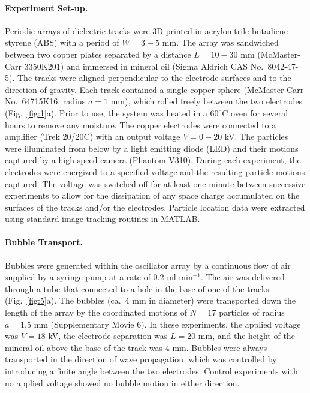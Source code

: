 \paragraph{Experiment Set-up.} 
Periodic arrays of dielectric tracks were 3D printed in acrylonitrile butadiene styrene (ABS) with a period of $W=3-5$ mm. The array was sandwiched between two copper plates separated by a distance $L=10-30$ mm (McMaster-Carr 3350K201) and immersed in mineral oil (Sigma Aldrich CAS No.~8042-47-5). The tracks were aligned perpendicular to the electrode surfaces and to the direction of gravity. Each track contained a single copper sphere (McMaster-Carr No.~64715K16, radius $a=1$ mm), which rolled freely between the two electrodes (Fig.~\ref{fig:1}a). Prior to use, the system was heated in a 60$^\text{o}$C oven for several hours to remove any moisture. The copper electrodes were connected to a amplifier (Trek 20/20C) with an output voltage $V=0-20$ kV.  The particles were illuminated from below by a light emitting diode (LED) and their motions captured by a high-speed camera (Phantom V310).  During each experiment, the electrodes were energized to a specified voltage and the resulting particle motions captured. The voltage was switched off for at least one minute between successive experiments to allow for the dissipation of any space charge accumulated on the surfaces of the tracks and/or the electrodes.  Particle location data were extracted using standard image tracking routines in MATLAB.


\paragraph{Bubble Transport.} 
Bubbles were generated within the oscillator array by a continuous flow of air supplied by a syringe pump at a rate of 0.2 ml min$^{-1}$. The air was delivered through a tube that connected to a hole in the base of one of the tracks (Fig.~\ref{fig:5}a).  The bubbles (ca.~4 mm in diameter) were transported down the length of the array by the coordinated motions of $N=17$ particles of radius $a=1.5$ mm (Supplementary Movie 6).  In these experiments, the applied voltage was $V=18$ kV, the electrode separation was $L=20$ mm, and the height of the mineral oil above the base of the track was 4 mm.  Bubbles were always transported in the direction of wave propagation, which was controlled by introducing a finite angle between the two electrodes.  Control experiments with no applied voltage showed no bubble motion in either direction.


